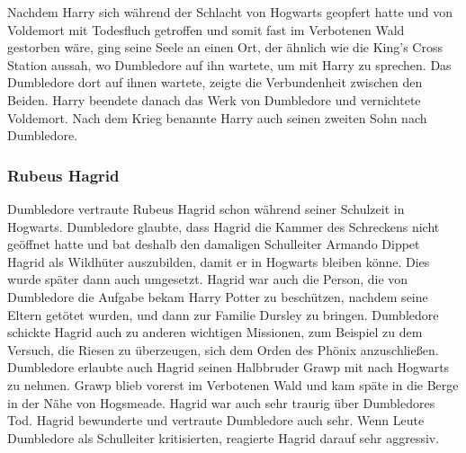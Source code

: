 \documentclass[a4paper, 10pt]{article}
\begin{document}
\vspace{10pt}
\newline
{}  
Nachdem Harry sich während der Schlacht von Hogwarts geopfert hatte und von Voldemort mit Todesfluch getroffen und somit fast im Verbotenen Wald gestorben wäre, ging seine Seele an einen Ort, der ähnlich wie die King's Cross Station aussah, wo Dumbledore auf ihn wartete, um mit Harry zu sprechen. Das Dumbledore dort auf ihnen wartete, zeigte die Verbundenheit zwischen den Beiden. Harry beendete danach das Werk von Dumbledore und vernichtete Voldemort. Nach dem Krieg benannte Harry auch seinen zweiten Sohn nach Dumbledore.
\subsubsection*{\large Rubeus Hagrid}
Dumbledore vertraute Rubeus Hagrid schon während seiner Schulzeit in Hogwarts. Dumbledore glaubte, dass Hagrid die Kammer des Schreckens nicht geöffnet hatte und bat deshalb den damaligen Schulleiter Armando Dippet Hagrid als Wildhüter auszubilden, damit er in Hogwarts bleiben könne. Dies wurde später dann auch umgesetzt. Hagrid war auch die Person, die von Dumbledore die Aufgabe bekam Harry Potter zu beschützen, nachdem seine Eltern getötet wurden, und dann zur Familie Dursley zu bringen. Dumbledore schickte Hagrid auch zu anderen wichtigen Missionen, zum Beispiel zu dem Versuch, die Riesen zu überzeugen, sich dem Orden des Phönix anzuschließen. Dumbledore erlaubte auch Hagrid seinen Halbbruder Grawp mit nach Hogwarts zu nehmen. Grawp blieb vorerst im Verbotenen Wald und kam späte in die Berge in der Nähe von Hogsmeade. Hagrid war auch sehr traurig über Dumbledores Tod. Hagrid bewunderte und vertraute Dumbledore auch sehr. Wenn Leute Dumbledore als Schulleiter kritisierten, reagierte Hagrid darauf sehr aggressiv.
\end{document}
